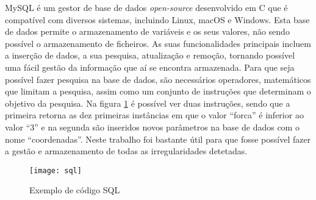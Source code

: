 MySQL é um gestor de base de dados \emph{open-source} desenvolvido em C que é compatível com diversos sistemas, incluindo Linux, macOS e Windows.
Esta base de dados permite o armazenamento de variáveis e os seus valores, não sendo possível o armazenamento de ficheiros.
As suas funcionalidades principais incluem a inserção de dados, a sua pesquisa, atualização e remoção, tornando possível uma fácil gestão da informação que aí se encontra armazenada.
Para que seja possível fazer pesquisa na base de dados, são necessários operadores, matemáticos que limitam a pesquisa, assim como um conjunto de instruções que determinam o objetivo da pesquisa.
Na figura \ref{fig:sql} é possível ver duas instruções, sendo que a primeira retorna as dez primeiras instâncias em que o valor ``forca'' é inferior ao valor ``3'' e na segunda são inseridos novos parâmetros na base de dados com o nome ``coordenadas''.
Neste trabalho foi bastante útil para que fosse possível fazer a gestão e armazenamento de todas as irregularidades detetadas.

\begin{figure}[hbtp]
	\centering
	\texttt{[image: sql]}
	\caption{Exemplo de código SQL}
	\label{fig:sql}
\end{figure}